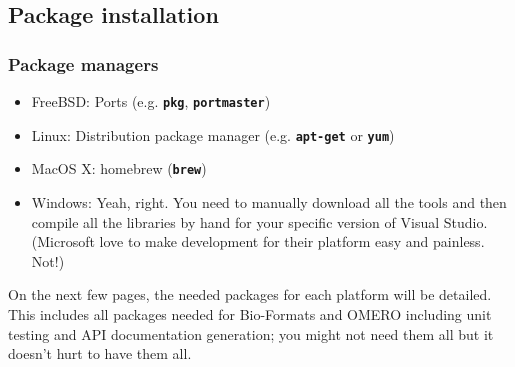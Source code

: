\documentclass{beamer}
\newcommand{\cmd}[1]{\textbf{\texttt{#1}}}
\begin{document}
\subsection{Package installation}
\begin{frame}
  \frametitle{Package managers}
  \begin{itemize}
  \item FreeBSD: Ports (e.g. \cmd{pkg}, \cmd{portmaster})
  \item Linux: Distribution package manager (e.g. \cmd{apt-get} or \cmd{yum})
  \item MacOS X: homebrew (\cmd{brew})
  \item Windows: Yeah, right.  You need to manually download all the
    tools and then compile all the libraries by hand for your specific
    version of Visual Studio.  (Microsoft love to make development for
    their platform easy and painless.  Not!)
  \end{itemize}

  On the next few pages, the needed packages for each platform will be
  detailed.  This includes all packages needed for Bio-Formats and
  OMERO including unit testing and API documentation generation; you
  might not need them all but it doesn't hurt to have them all.
\end{frame}
\end{document}
